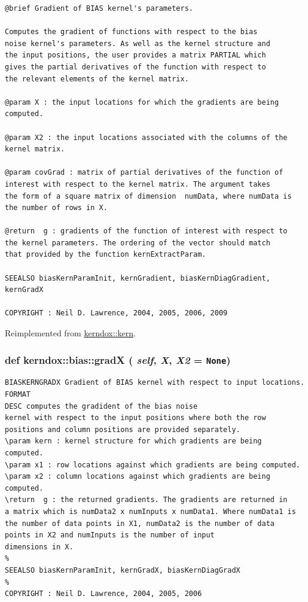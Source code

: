 \footnotesize\begin{verbatim}@brief Gradient of BIAS kernel's parameters.

Computes the gradient of functions with respect to the bias
noise kernel's parameters. As well as the kernel structure and
the input positions, the user provides a matrix PARTIAL which
gives the partial derivatives of the function with respect to
the relevant elements of the kernel matrix.

@param X : the input locations for which the gradients are being
computed. 

@param X2 : the input locations associated with the columns of the
kernel matrix.

@param covGrad : matrix of partial derivatives of the function of
interest with respect to the kernel matrix. The argument takes
the form of a square matrix of dimension  numData, where numData is
the number of rows in X.

@return  g : gradients of the function of interest with respect to
the kernel parameters. The ordering of the vector should match
that provided by the function kernExtractParam.

SEEALSO biasKernParamInit, kernGradient, biasKernDiagGradient, kernGradX

COPYRIGHT : Neil D. Lawrence, 2004, 2005, 2006, 2009

\end{verbatim}
\normalsize
 

Reimplemented from \hyperlink{classkerndox_1_1kern}{kerndox::kern}.\hypertarget{classkerndox_1_1bias_d19a0539d91a6cf8deda239b18bd7163}{
\subsubsection[{gradX}]{\setlength{\rightskip}{0pt plus 5cm}def kerndox::bias::gradX ( {\em self}, \/   {\em X}, \/   {\em X2} = {\tt None})}}
\label{classkerndox_1_1bias_d19a0539d91a6cf8deda239b18bd7163}




\footnotesize\begin{verbatim}BIASKERNGRADX Gradient of BIAS kernel with respect to input locations.
FORMAT
DESC computes the gradident of the bias noise
kernel with respect to the input positions where both the row
positions and column positions are provided separately.
\param kern : kernel structure for which gradients are being
computed.
\param x1 : row locations against which gradients are being computed.
\param x2 : column locations against which gradients are being computed.
\return  g : the returned gradients. The gradients are returned in
a matrix which is numData2 x numInputs x numData1. Where numData1 is
the number of data points in X1, numData2 is the number of data
points in X2 and numInputs is the number of input
dimensions in X.
%
SEEALSO biasKernParamInit, kernGradX, biasKernDiagGradX
%
COPYRIGHT : Neil D. Lawrence, 2004, 2005, 2006

\end{verbatim}
\normalsize
 

